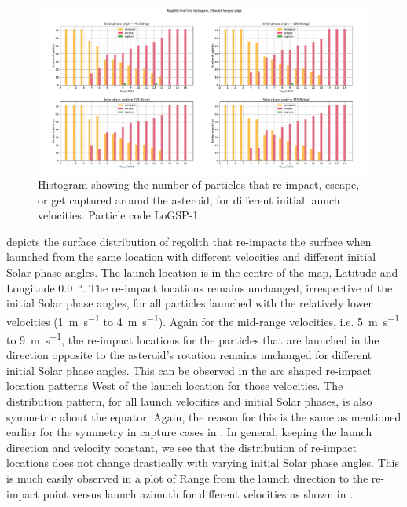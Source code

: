 \begin{figure}[htb]
\centering
\captionsetup{justification=centering}
\includegraphics[angle=90, width=\textwidth, height=\textheight, keepaspectratio=true]{longest_edge_perturbations/3.2Density_1cmSize/final_fate_versus_launch_velocity_histogram_all_solar_phases.pdf}
\caption{Histogram showing the number of particles that re-impact, escape, or get captured around the asteroid, for different initial launch velocities. Particle code LoGSP-1.}
\label{fig:LoGSP_1_final_fate_histogram}
\end{figure}
\FloatBarrier
 depicts the surface distribution of regolith that re-impacts the surface when launched from the same location with different velocities and different initial Solar phase angles. The launch location is in the centre of the map, Latitude and Longitude \SI{0.0}{\degree}. The re-impact locations remains unchanged, irrespective of the initial Solar phase angles, for all particles launched with the relatively lower velocities (\SI{1}{\metre\per\second} to \SI{4}{\metre\per\second}). Again for the mid-range velocities, i.e. \SI{5}{\metre\per\second} to \SI{9}{\metre\per\second}, the re-impact locations for the particles that are launched in the direction opposite to the asteroid's rotation remains unchanged for different initial Solar phase angles. This can be observed in the arc shaped re-impact location patterns West of the launch location for those velocities. The distribution pattern, for all launch velocities and initial Solar phases, is also symmetric about the equator. Again, the reason for this is the same as mentioned earlier for the symmetry in capture cases in . In general, keeping the launch direction and velocity constant, we see that the distribution of re-impact locations does not change drastically with varying initial Solar phase angles. This is much easily observed in a plot of Range from the launch direction to the re-impact point versus launch azimuth for different velocities as shown in .
